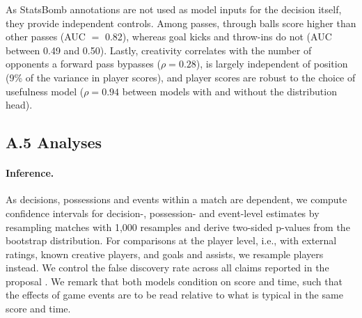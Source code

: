 As StatsBomb annotations are not used as model inputs for the decision itself, they provide independent controls.
Among passes, through balls score higher than other passes (AUC $=$ 0.82), whereas goal kicks and throw-ins do not
(AUC between 0.49 and 0.50). Lastly, creativity correlates with the number of opponents a forward pass bypasses
($\rho = 0.28$), is largely independent of position (9\% of the variance in player scores), and player scores are
robust to the choice of usefulness model ($\rho = 0.94$ between models with and without the distribution head).

\subsection*{A.5 Analyses}

\paragraph{Inference.} As decisions, possessions and events within a match are dependent, we compute confidence
intervals for decision-, possession- and event-level estimates by resampling matches
\parencite[cluster bootstrap;][]{cameron2008bootstrap} with 1,000 resamples and derive two-sided p-values from the
bootstrap distribution. For comparisons at the player level, i.e., with external ratings, known creative players, and
goals and assists, we resample players instead. We control the false discovery rate across all claims reported in
the proposal \parencite{benjamini1995controlling}. We remark that both models condition on score and time, such that
the effects of game events are to be read relative to what is typical in the same score and time.

